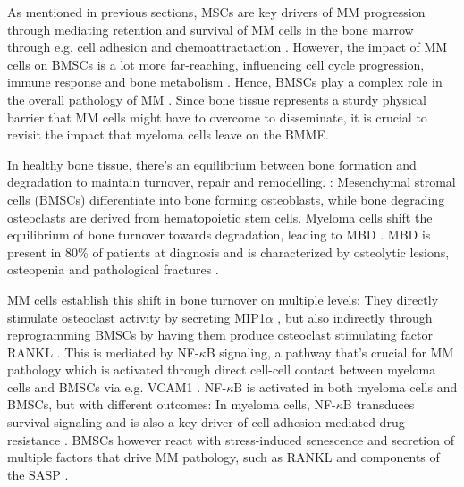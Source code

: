 \label{sec:intro_myeloma_hMSC_interactions}
As mentioned in previous sections, \acp{MSC} are key drivers of \ac{MM}
progression through mediating retention and survival of \ac{MM} cells in the
bone marrow through e.g. cell adhesion and chemoattractaction
\cite{zeissigTumourDisseminationMultiple2020}. However, the impact of \ac{MM}
cells on \acp{BMSC} is a lot more far-reaching, influencing cell cycle
progression, immune response and bone metabolism
\cite{dotterweichContactMyelomaCells2016,
    fernandoTranscriptomeAnalysisMesenchymal2019}. Hence, \acp{BMSC} play a complex
role in the overall pathology of \ac{MM} \cite{mangoliniBoneMarrowStromal2020}.
Since bone tissue represents a sturdy physical barrier that \ac{MM} cells might
have to overcome to disseminate, it is crucial to revisit the impact that
myeloma cells leave on the \ac{BMME}.

In healthy bone tissue, there's an equilibrium between bone formation and
degradation to maintain turnover, repair and remodelling.
\cite{vaananenMechanismBoneTurnover1993}: Mesenchymal stromal cells (BMSCs)
differentiate into bone forming osteoblasts, while bone degrading osteoclasts
are derived from hematopoietic stem cells. Myeloma cells shift the equilibrium
of bone turnover towards degradation, leading to \ac{MBD}
\cite{hideshimaUnderstandingMultipleMyeloma2007}. MBD is present in 80\% of
patients at diagnosis and is characterized by osteolytic lesions, osteopenia and
pathological fractures \cite{terposPathogenesisBoneDisease2018}.


\ac{MM} cells establish this shift in bone turnover on multiple levels: They
directly stimulate osteoclast activity by secreting MIP1$\alpha$
\cite{obaMIP1alphaUtilizesBoth2005}, but also indirectly through reprogramming
\acp{BMSC} by having them produce osteoclast stimulating factor RANKL
\cite{tsubakiHGFMetNFkB2020}. This is mediated by NF-$\kappa$B signaling, a
pathway that's crucial for MM pathology which is activated through direct
cell-cell contact between myeloma cells and \acp{BMSC} via e.g. VCAM1
\cite{cippitelliRoleNFkBSignaling2023, royNFkBActivatingPathways2018}.
NF-$\kappa$B is activated in both myeloma cells and \acp{BMSC}, but with
different outcomes: In myeloma cells, NF-$\kappa$B transduces survival signaling
and is also a key driver of cell adhesion mediated drug resistance
\cite{royNoncanonicalNFkBMutations2017, landowskiCellAdhesionmediatedDrug2003}.
\acp{BMSC} however react with stress-induced senescence and secretion of
multiple factors that drive \ac{MM} pathology, such as RANKL and components of
the \ac{SASP} \cite{chauhanMultipleMyelomaCell1996,
    fairfieldMultipleMyelomaCells2020}.


